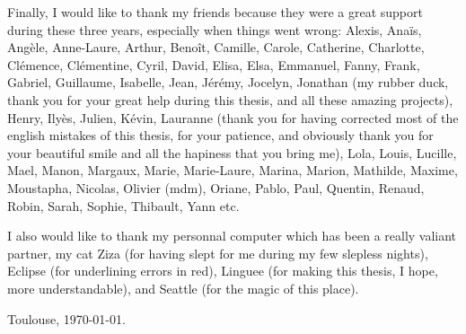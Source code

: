 Finally, I would like to thank my friends because they were a great support during these three years,
especially when things went wrong: 
Alexis, Ana\"is, Ang\`ele, Anne-Laure, Arthur, Beno\^it, Camille, Carole, Catherine, Charlotte, Cl\'emence, Cl\'ementine, Cyril, David, Elisa, Elsa, Emmanuel, Fanny,
Frank, Gabriel, Guillaume, Isabelle, Jean, J\'er\'emy, Jocelyn, Jonathan (my rubber duck, thank you for your great help during this thesis, and all these amazing projects), 
Henry, Ily\`es, Julien, K\'evin,
Lauranne (thank you for having corrected most of the english mistakes of this thesis, for your patience, and obviously thank you for your beautiful smile
and all the hapiness that you bring me), 
Lola, Louis, Lucille, Mael, Manon, Margaux, Marie, Marie-Laure, Marina, Marion, Mathilde, Maxime, Moustapha, Nicolas, Olivier (mdm), Oriane, 
Pablo, Paul, Quentin, Renaud, Robin, Sarah, Sophie, Thibault, Yann etc.

I also would like to thank my personnal computer which has been a really valiant partner, 
my cat Ziza (for having slept for me during my few slepless nights),
Eclipse (for underlining errors in red), 
Linguee (for making this thesis, I hope, more understandable),
and Seattle (for the magic of this place).


\vspace{2cm}

\hfill Toulouse, \today.
